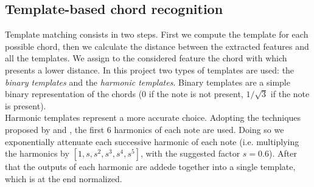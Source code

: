 \subsection{Template-based chord recognition}
\label{subsec:templates}

Template matching consists in two steps. First we compute the template for each possible chord, then we calculate the distance between the extracted features and all the templates. We assign to the considered feature the chord with which presents a lower distance. In this project two types of templates are used: the \textit{binary templates} and the \textit{harmonic templates}. Binary templates are a simple binary representation of the chords (0 if the note is not present, $1/\sqrt{3}$ if the note is present). \\
%
Harmonic templates represent a more accurate choice. Adopting the techniques proposed by \cite{gomez2006tonal} and \cite{oudre2009chord}, the first 6 harmonics of each note are used. Doing so we exponentially attenuate each successive harmonic of each note (i.e. multiplying the harmonics by $[1, s, s^2, s^3, s^4, s^5]$, with the suggested factor $s=0.6$). After that the outputs of each harmonic are addede together into a single template, which is at the end normalized.

